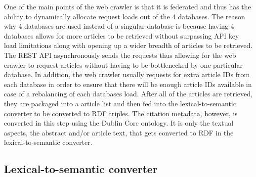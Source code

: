 \documentclass[12pt]{article}
\begin{document}
	One of the main points of the web crawler is that it is federated and thus has the ability to dynamically allocate request loads out of the 4 databases. The reason why 4 databases are used instead of a singular database is because having 4 databases allows for more articles to be retrieved without surpassing API key load limitations along with opening up a wider breadth of articles to be retrieved. The REST API asynchronously sends the requests thus allowing for the web crawler to request articles without having to be bottlenecked by one particular database. In addition, the web crawler usually requests for extra article IDs from each database in order to ensure that there will be enough article IDs available in case of a rebalancing of each databases load. 
	After all of the articles are retrieved, they are packaged into a article list and then fed into the lexical-to-semantic converter to be converted to RDF triples. The citation metadata, however, is converted in this step using the Dublin Core ontology. It is only the textual aspects, the abstract and/or article text, that gets converted to RDF in the lexical-to-semantic converter.
	\subsection{Lexical-to-semantic converter}
	
\end{document}
